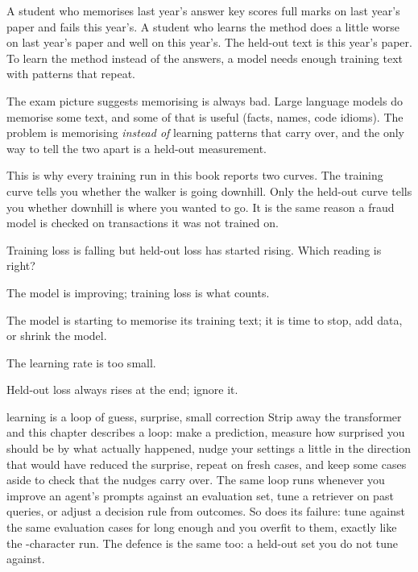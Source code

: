 \Picture A student who memorises last year's answer key scores full marks on last year's paper and fails
this year's. A student who learns the method does a little worse on last year's paper and well on this
year's. The held-out text is this year's paper. To learn the method instead of the answers, a model needs
enough training text with patterns that repeat.

\begin{breaks}
The exam picture suggests memorising is always bad. Large language models do memorise some text, and some
of that is useful (facts, names, code idioms). The problem is memorising \emph{instead of} learning patterns
that carry over, and the only way to tell the two apart is a held-out measurement.
\end{breaks}

\Why This is why every training run in this book reports two curves. The training curve tells you whether
the walker is going downhill. Only the held-out curve tells you whether downhill is where you wanted to go.
It is the same reason a fraud model is checked on transactions it was not trained on.

\begin{checkq}
Training loss is falling but held-out loss has started rising. Which reading is right?
\begin{options}
\item The model is improving; training loss is what counts.
\item The model is starting to memorise its training text; it is time to stop, add data, or shrink the model.
\item The learning rate is too small.
\item Held-out loss always rises at the end; ignore it.
\end{options}
\end{checkq}


\begin{principle}{learning is a loop of guess, surprise, small correction}
Strip away the transformer and this chapter describes a loop: make a prediction, measure how surprised you
should be by what actually happened, nudge your settings a little in the direction that would have reduced
the surprise, repeat on fresh cases, and keep some cases aside to check that the nudges carry over. The same
loop runs whenever you improve an agent's prompts against an evaluation set, tune a retriever on past
queries, or adjust a decision rule from outcomes. So does its failure: tune against the same evaluation
cases for long enough and you overfit to them, exactly like the \nEightOverSmall-character run. The defence
is the same too: a held-out set you do not tune against.
\end{principle}

